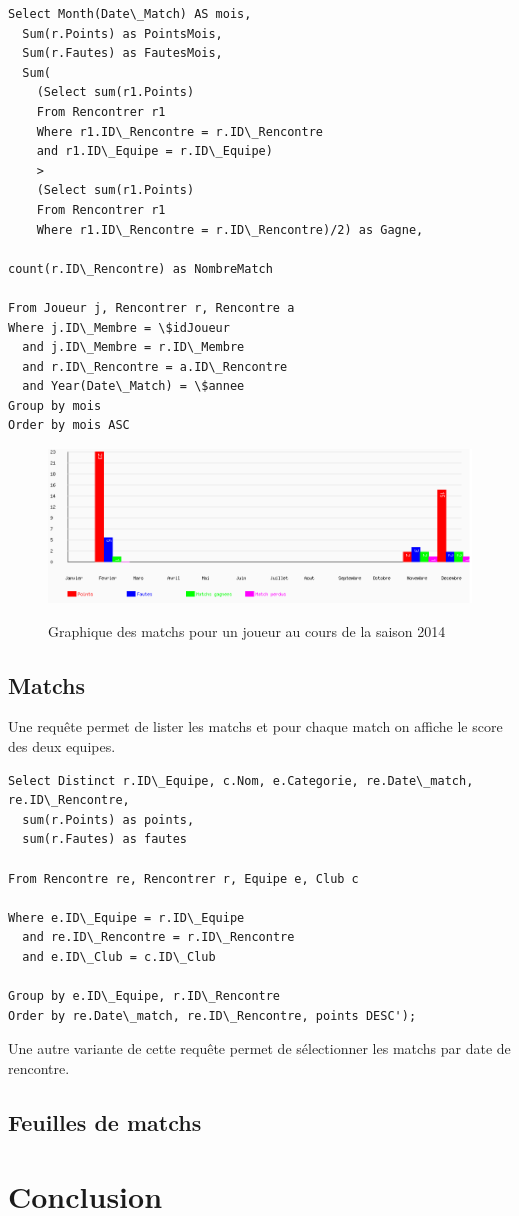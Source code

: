 \documentclass[a4paper»,8pt,french,fleqn]{report}
\begin{document}
\begin{lstlisting}
Select Month(Date\_Match) AS mois,
  Sum(r.Points) as PointsMois,
  Sum(r.Fautes) as FautesMois,
  Sum(
    (Select sum(r1.Points)
    From Rencontrer r1
    Where r1.ID\_Rencontre = r.ID\_Rencontre
    and r1.ID\_Equipe = r.ID\_Equipe)
    >
    (Select sum(r1.Points)
    From Rencontrer r1
    Where r1.ID\_Rencontre = r.ID\_Rencontre)/2) as Gagne,
    
count(r.ID\_Rencontre) as NombreMatch

From Joueur j, Rencontrer r, Rencontre a
Where j.ID\_Membre = \$idJoueur
  and j.ID\_Membre = r.ID\_Membre
  and r.ID\_Rencontre = a.ID\_Rencontre
  and Year(Date\_Match) = \$annee
Group by mois 
Order by mois ASC
\end{lstlisting}

\begin{figure}[h]
  \centering
    \includegraphics[scale=0.5]{graphe.png}
    \label{fig:graph}
    \caption{Graphique des matchs pour un joueur au cours de la saison 2014}
\end{figure}


\section{Matchs}
Une requête permet de lister les matchs et pour chaque match on affiche le score des deux equipes.

\begin{lstlisting}
Select Distinct r.ID\_Equipe, c.Nom, e.Categorie, re.Date\_match, re.ID\_Rencontre,
  sum(r.Points) as points, 
  sum(r.Fautes) as fautes 

From Rencontre re, Rencontrer r, Equipe e, Club c

Where e.ID\_Equipe = r.ID\_Equipe
  and re.ID\_Rencontre = r.ID\_Rencontre
  and e.ID\_Club = c.ID\_Club

Group by e.ID\_Equipe, r.ID\_Rencontre
Order by re.Date\_match, re.ID\_Rencontre, points DESC');
\end{lstlisting}

Une autre variante de cette requête permet de sélectionner les matchs par date de rencontre.

\section{Feuilles de matchs}

\chapter*{Conclusion}
\end{document}
